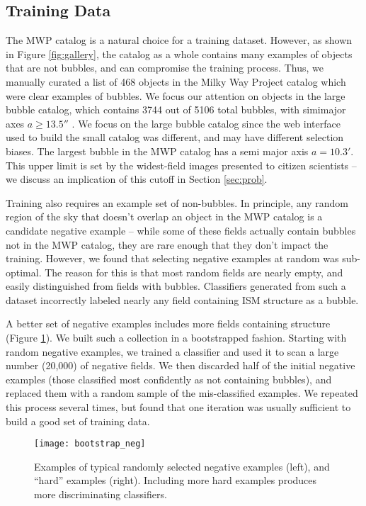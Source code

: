 \documentclass[preprint]{aastex}
\begin{document}
\subsection{Training Data}
\label{sec:method_training_data}
The MWP catalog is a natural choice for a training dataset. However, as shown in Figure \ref{fig:gallery}, the catalog as a whole contains many examples of objects that are not bubbles, and can compromise the training process. Thus, we manually curated a list of 468 objects in the Milky Way Project catalog which were clear examples of bubbles. We focus our attention on objects in the large bubble catalog, which contains 3744 out of 5106 total bubbles, with simimajor axes  $a \geq 13.5''$  \citep{Simpson12}. We focus on the large bubble catalog since the web interface used to build the small catalog was different, and may have different selection biases. The largest bubble in the MWP catalog has a semi major axis $a=10.3'$. This upper limit is set by the widest-field images presented to citizen scientists -- we discuss an implication of this cutoff in Section \ref{sec:prob}.

Training also requires an example set of non-bubbles. In principle, any random region of the sky that doesn't overlap an object in the MWP catalog is a candidate negative example -- while some of these fields actually contain bubbles not in the MWP catalog, they are rare enough that they don't  impact the training. However, we found that selecting negative examples at random was sub-optimal. The reason for this is that most random fields are nearly empty, and easily distinguished from fields with bubbles. Classifiers generated from such a dataset incorrectly labeled nearly any field containing ISM structure as a bubble.

A better set of negative examples includes more fields containing structure (Figure \ref{fig:bootstrap_neg}). We built such a collection in a bootstrapped fashion. Starting with random negative examples, we trained a classifier and used it to scan a large number (20,000) of negative fields. We then discarded half of the initial negative examples (those classified most confidently as not containing bubbles), and replaced them with a random sample of the mis-classified examples. We repeated this process several times, but found that one iteration was usually sufficient to build a good set of training data.

\begin{figure}[h!]
\texttt{[image: bootstrap\_neg]}
\caption{Examples of typical randomly selected negative examples (left), and ``hard'' examples (right). Including more hard examples produces more discriminating classifiers.}
\label{fig:bootstrap_neg}
\end{figure}
\end{document}
